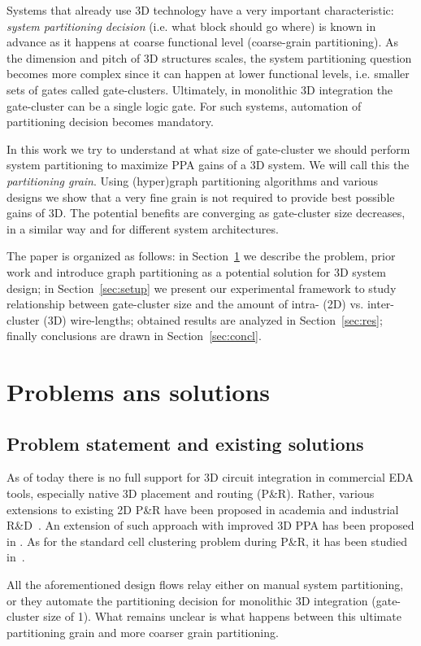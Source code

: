 \documentclass[conference]{IEEEtran}
\begin{document}
Systems that already use 3D technology have a very important characteristic: \textit{system partitioning decision} (i.e. what block should go where) is known in advance as it happens at coarse functional level (coarse-grain partitioning). As the dimension and pitch of 3D structures scales, the system partitioning question becomes more complex since it can happen at lower functional levels, i.e. smaller sets of gates called gate-clusters. Ultimately, in monolithic 3D integration the gate-cluster can be a single logic gate. For such systems, automation of partitioning decision becomes mandatory. 

In this work we try to understand at what size of gate-cluster we should perform system partitioning to maximize PPA gains of a 3D system. We will call this the \textit{partitioning grain}. Using (hyper)graph partitioning algorithms and various designs we show that a very fine grain is not required to provide best possible gains of 3D. The potential benefits are converging as gate-cluster size decreases, in a similar way and for different system architectures.

The paper is organized as follows: in Section~\ref{sec:optobj} we describe the problem, prior work and introduce graph partitioning as a potential solution for 3D system design; in Section~\ref{sec:setup} we present our experimental framework to study relationship between gate-cluster size and the amount of intra- (2D) vs. inter-cluster (3D) wire-lengths; obtained results are analyzed in Section~\ref{sec:res}; finally conclusions are drawn in Section~\ref{sec:concl}.

\section{Problems ans solutions}\label{sec:optobj}
\subsection{Problem statement and existing solutions}
As of today there is no full support for 3D circuit integration in commercial EDA tools, especially native 3D placement and routing (P\&R). Rather, various extensions to existing 2D P\&R have been proposed in academia and industrial R\&D~\cite{Panth}. An extension of such approach with improved 3D PPA has been proposed in \cite{Chang2016}. As for the standard cell clustering problem during P\&R, it has been studied in~\cite{Moura2017}. 

All the aforementioned design flows relay either on manual system partitioning, or they automate the partitioning decision for monolithic 3D integration (gate-cluster size of 1). What remains unclear is what happens between this ultimate partitioning grain and more coarser grain partitioning.  
\end{document}
